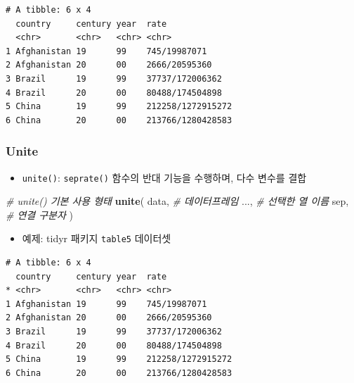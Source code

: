 \documentclass[
  11pt,
]{krantz}
\newenvironment{Shaded}{\begin{snugshade}}{\end{snugshade}}
\newcommand{\CommentTok}[1]{\textcolor[rgb]{0.37,0.37,0.37}{\textit{#1}}}
\newcommand{\KeywordTok}[1]{\textcolor[rgb]{0.27,0.27,0.27}{\textbf{#1}}}
\newcommand{\NormalTok}[1]{#1}
\newcommand{\OperatorTok}[1]{\textcolor[rgb]{0.43,0.43,0.43}{\textbf{#1}}}
\newcommand{\StringTok}[1]{\textcolor[rgb]{0.5,0.5,0.5}{#1}}
\providecommand{\tightlist}{%
  \setlength{\itemsep}{0pt}\setlength{\parskip}{0pt}}
\begin{document}
\begin{verbatim}
# A tibble: 6 x 4
  country     century year  rate             
  <chr>       <chr>   <chr> <chr>            
1 Afghanistan 19      99    745/19987071     
2 Afghanistan 20      00    2666/20595360    
3 Brazil      19      99    37737/172006362  
4 Brazil      20      00    80488/174504898  
5 China       19      99    212258/1272915272
6 China       20      00    213766/1280428583
\end{verbatim}

\normalsize

\hypertarget{unite}{%
\subsubsection*{Unite}\label{unite}}


\begin{itemize}
\tightlist
\item
  \texttt{unite()}: \texttt{seprate()} 함수의 반대 기능을 수행하며, 다수 변수를 결합
\end{itemize}

\footnotesize

\begin{Shaded}
\begin{Highlighting}[]
\CommentTok{# unite() 기본 사용 형태}
\KeywordTok{unite}\NormalTok{(}
\NormalTok{  data, }\CommentTok{# 데이터프레임}
\NormalTok{  ..., }\CommentTok{# 선택한 열 이름}
\NormalTok{  sep, }\CommentTok{# 연결 구분자}
\NormalTok{)}
\end{Highlighting}
\end{Shaded}

\normalsize

\begin{itemize}
\tightlist
\item
  예제: tidyr 패키지 \texttt{table5} 데이터셋
\end{itemize}

\footnotesize

\begin{Shaded}
\end{Shaded}

\begin{verbatim}
# A tibble: 6 x 4
  country     century year  rate             
* <chr>       <chr>   <chr> <chr>            
1 Afghanistan 19      99    745/19987071     
2 Afghanistan 20      00    2666/20595360    
3 Brazil      19      99    37737/172006362  
4 Brazil      20      00    80488/174504898  
5 China       19      99    212258/1272915272
6 China       20      00    213766/1280428583
\end{verbatim}
\end{document}
